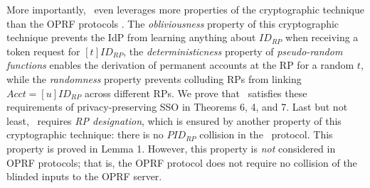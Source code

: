 More importantly, \usso\ even leverages more properties of the cryptographic technique than the OPRF protocols \cite{oprf-proved,voprf-proved,oprf-bitcoin-wallet}.
The \emph{obliviousness} property of this cryptographic technique prevents the IdP from learning anything about $ID_{RP}$ when receiving a token request for $[t]ID_{RP}$,
the \emph{deterministicness} property of \emph{pseudo-random functions} enables the derivation of permanent accounts at the RP for a random $t$,
while the \emph{randomness} property prevents colluding RPs from linking $Acct = [u]ID_{RP}$ across different RPs.
We prove that \usso\ satisfies these requirements of privacy-preserving SSO in 
    Theorems 6, 4, and 7.
Last but not least,
    \usso\ requires \emph{RP designation},
        which is ensured by another property of this cryptographic technique:
        there is no $PID_{RP}$ collision in the \usso\ protocol.
This property is proved in Lemma 1.
However, this property is \emph{not} considered in OPRF protocols;
that is, the OPRF protocol \cite{oprf-proved,voprf-proved,oprf-bitcoin-wallet} does not require no collision of the blinded inputs to the OPRF server.




